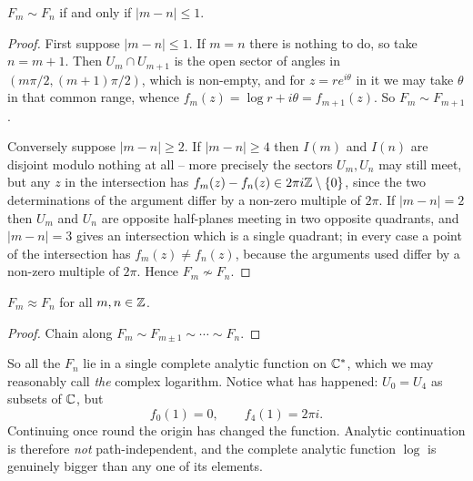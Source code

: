 \documentclass[a4paper]{scrartcl}
\newcommand{\Cs}{\C^*}
\begin{document}
\begin{proposition}\label{prop:logelements}
	$F_m \sim F_n$ if and only if $|m - n| \leq 1$.
\end{proposition}

\begin{proof}
	First suppose $|m-n| \leq 1$. If $m = n$ there is nothing to do, so take $n = m+1$.
	Then $U_m \cap U_{m+1}$ is the open sector of angles in $(m\pi/2, (m+1)\pi/2)$, which
	is non-empty, and for $z = re^{i\theta}$ in it we may take $\theta$ in that common
	range, whence $f_m(z) = \log r + i\theta = f_{m+1}(z)$. So $F_m \sim F_{m+1}$.

	Conversely suppose $|m - n| \geq 2$. If $|m - n| \geq 4$ then $I(m)$ and $I(n)$ are
	disjoint modulo nothing at all -- more precisely the sectors $U_m, U_n$ may still
	meet, but any $z$ in the intersection has $f_m(z) - f_n(z) \in 2\pi i \mathbb{Z} \setminus \{0\}$,
	since the two determinations of the argument differ by a non-zero multiple of $2\pi$.
	If $|m-n| = 2$ then $U_m$ and $U_n$ are opposite half-planes meeting in two opposite
	quadrants, and $|m - n| = 3$ gives an intersection which is a single quadrant; in every
	case a point of the intersection has $f_m(z) \neq f_n(z)$, because the arguments used
	differ by a non-zero multiple of $2\pi$. Hence $F_m \not\sim F_n$.
\end{proof}

\begin{corollary}\label{cor:logconnected}
	$F_m \approx F_n$ for all $m, n \in \mathbb{Z}$.
\end{corollary}

\begin{proof}
	Chain along $F_m \sim F_{m\pm 1} \sim \cdots \sim F_n$.
\end{proof}

So all the $F_n$ lie in a single complete analytic function on $\Cs$, which we may
reasonably call \emph{the} complex logarithm. Notice what has happened: $U_0 = U_4$ as
subsets of $\mathbb{C}$, but
$$
f_0(1) = 0, \qquad f_4(1) = 2\pi i.
$$
Continuing once round the origin has changed the function. Analytic continuation is
therefore \emph{not} path-independent, and the complete analytic function $\log$ is
genuinely bigger than any one of its elements.

\begin{center}
\end{center}
\end{document}
